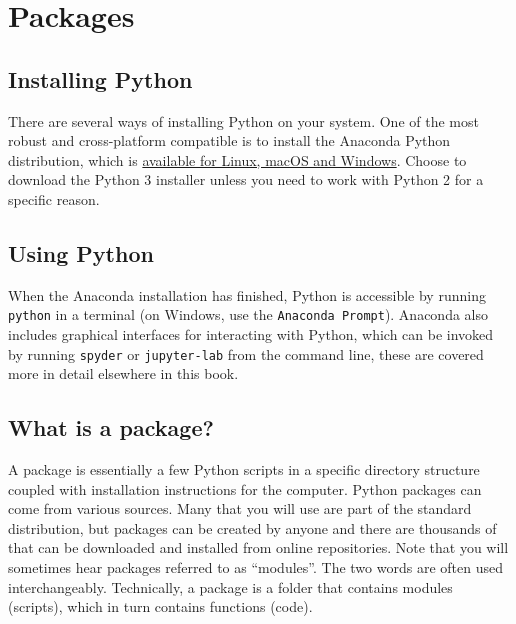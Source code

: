 \documentclass[]{Nemilov}
\begin{document}
\hypertarget{py-dev-packages}{%
\section{Packages}\label{py-dev-packages}}

\hypertarget{py-dev-installing-Python}{%
\subsection{Installing Python}\label{py-dev-installing-Python}}

There are several ways of installing Python on your system. One of the most
robust and cross-platform compatible is to install the Anaconda Python
distribution, which is \href{https://www.anaconda.com/distribution/\#download-section}{available for Linux, macOS and
Windows}. Choose to
download the Python 3 installer unless you need to work with Python 2 for a
specific reason.

\hypertarget{py-dev-using-Python}{%
\subsection{Using Python}\label{py-dev-using-Python}}

When the Anaconda installation has finished, Python is accessible by running
\texttt{python} in a terminal (on Windows, use the \texttt{Anaconda\ Prompt}). Anaconda also
includes graphical interfaces for interacting with Python, which can be invoked
by running \texttt{spyder} or \texttt{jupyter-lab} from the command line, these are covered
more in detail elsewhere in this book.

\hypertarget{py-dev-what-is-a-package}{%
\subsection{What is a package?}\label{py-dev-what-is-a-package}}

A package is essentially a few Python scripts in a specific directory structure
coupled with installation instructions for the computer. Python packages can
come from various sources. Many that you will use are part of the standard distribution, but packages can be created by anyone and there are thousands of that can be downloaded and installed from online repositories. Note that you will sometimes hear packages referred
to as ``modules''. The two words are often used interchangeably. Technically,
a package is a folder that contains modules (scripts), which in turn contains functions (code).
\end{document}
